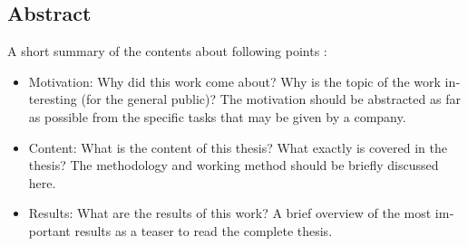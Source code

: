 

\begin{otherlanguage}{american}
	\chapter*{Abstract}
	A short summary of the contents about following points :
	\begin{itemize}
		\item Motivation: Why did this work come about? Why is the topic of the work interesting (for the general public)? The motivation should be abstracted as far as possible from the specific tasks that may be given by a company.
		\item Content: What is the content of this thesis? What exactly is covered in the thesis? The methodology and working method should be briefly discussed here.
		\item Results: What are the results of this work? A brief overview of the most important results as a teaser to read the complete thesis.
	\end{itemize}
	\medskip
	
	\noindent

\end{otherlanguage}
